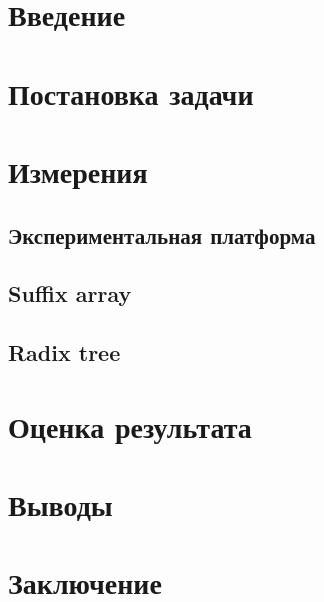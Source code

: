 \newpage
\tableofcontents
\newpage

\section{Введение}


\newpage
\section{Постановка задачи}


\newpage
\section{Измерения}


\subsection{Экспериментальная платформа}


\subsection{Suffix array}


\subsection{Radix tree}


\section{Оценка результата}


\section{Выводы}


\section{Заключение}
